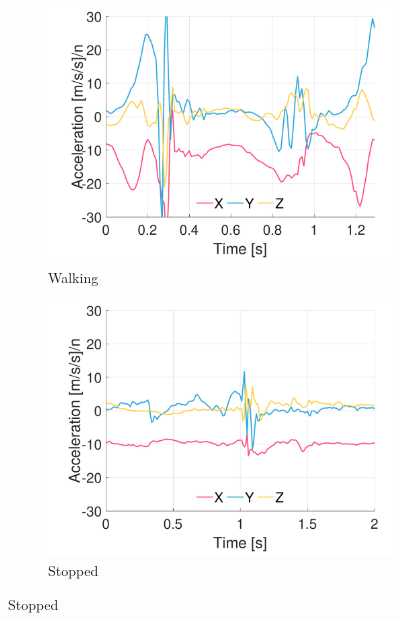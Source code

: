 \begin{figure}[p]
\centering
    \begin{subfigure}[b]{0.49\textwidth}
         \centering
         \includegraphics[width=\textwidth]{content/3-Methods/example-data/ch3_example_data_subject_01_r_ankle_accel_activity_walking.pdf}
         \caption{Walking}
    \end{subfigure}
    \begin{subfigure}[b]{0.49\textwidth}
         \centering
         \includegraphics[width=\textwidth]{content/3-Methods/example-data/ch3_example_data_subject_01_r_ankle_accel_activity_stop.pdf}
         \caption{Stopped}
    \end{subfigure}
    

\end{figure}
